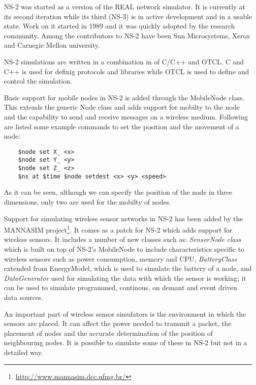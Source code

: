 \label{subsec:ns2}

NS-2 was started as a version of the REAL network simulator. It is currently at its 
second iteration while its third (NS-3) is in active development and in a usable state.
Work on it started in 1989 and it was quickly adopted by the research community.
Among the contributors to NS-2 have been Sun Microsystems, Xerox and Carnegie Mellon 
university. 

NS-2 simulations are written in a combination in of C/C++ and OTCL. C and C++ is 
used for definig protocols and libraries while OTCL is used to define and control
the simulation.

Basic support for mobile nodes in NS-2 is added through the MobileNode class. This extends
the generic Node class and adds support for mobilty to the node and the capability to
send and receive messages on a wireless medium. 
Following are listed some example commands to set the position and the movement of a node:
\lstset{numbers=none,captionpos=b,frame=single,language=C,caption=Commands to set the position and movement of a node,label=lst:saddrule}
\begin{lstlisting}
	$node set X_ <x>
	$node set Y_ <y>
	$node set Z_ <z>
	$ns at $time $node setdest <x> <y> <speed>
\end{lstlisting}
As it can be seen, although we can specify the position of the node in three dimensions,
only two are used for the mobilty of nodes.

Support for simulating wireless sensor networks in NS-2 has been added by the 
MANNASIM project\footnote{\url{http://www.mannasim.dcc.ufmg.br/}}. It comes as
a patch for NS-2 which adds support for wireless sensors. It includes a number of
new classes such as: \textit{SensorNode class} which is built on top of NS-2's MobileNode 
to include characteristics specific to wireless sensors such as power 
consumption, memory and CPU, \textit{BatteryClass} extended from EnergyModel, 
which is used to simulate
the battery of a node, and \textit{DataGenerator} used for simulating the data 
with which the sensor is
working; it can be used to simulate programmed, continous, on demant and event 
driven
data sources.



An important part of wireless sensor simulators is the environment in which the sensors
are placed. It can affect the power needed to transmit a packet, the placement of nodes
and the accurate determination of the position of neighbouring nodes. It is possible to
simulate some of these in NS-2 but not in a detailed way.
